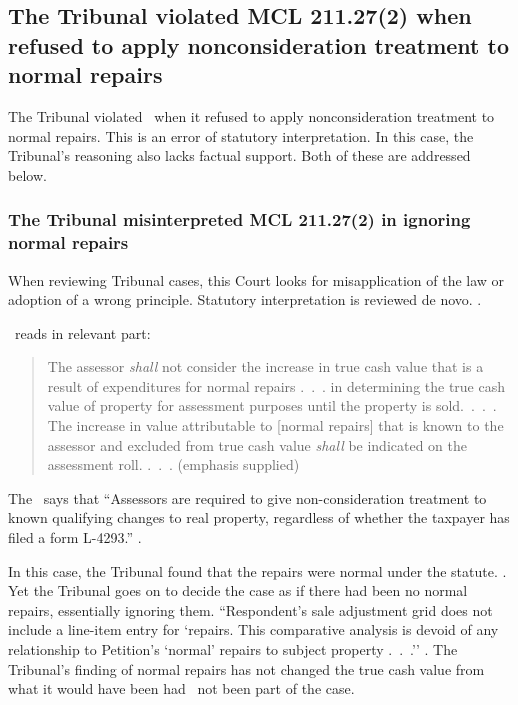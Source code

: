 \documentclass[12pt,\documentclassflag]{michiganCourtOfAppealsBrief}
\begin{document}
\subsection{The Tribunal violated MCL 211.27(2) when refused to apply nonconsideration treatment to normal repairs}

The Tribunal violated \mathieuGast\ when it refused to apply nonconsideration treatment to normal repairs. This is an error of statutory interpretation. In this case, the Tribunal's reasoning also lacks factual support. Both of these are addressed below.

\subsubsection{The Tribunal misinterpreted MCL 211.27(2) in ignoring normal repairs}

When reviewing Tribunal cases, this Court looks for misapplication of the law or adoption of a wrong principle. Statutory interpretation is reviewed de novo. . 

\mathieuGast\ reads in relevant part:

\begin{quote}
The assessor {\em shall} not consider the increase in true cash value that is a result of expenditures for normal repairs .~.~. in determining the true cash value of property for assessment purposes until the property is sold.~.~.~. The increase in value attributable to [normal repairs] that is known to the assessor and excluded from true cash value {\em shall} be indicated on the assessment roll. .~.~. (emphasis supplied)
\end{quote}

The \STC\ says that ``Assessors are required to give non-consideration treatment to known qualifying changes to real property, regardless of whether the taxpayer has filed a form L-4293.'' .

In this case, the Tribunal found that the repairs were normal under the statute. \foj[4]. Yet the Tribunal goes on to decide the case as if there had been no normal repairs, essentially ignoring them. ``Respondent's sale adjustment grid does not include a line-item entry for `repairs. This comparative analysis is devoid of any relationship to Petition's `normal' repairs to subject property .~.~.'' \foj[6]. The Tribunal's finding of normal repairs has not changed the true cash value from what it would have been had \mathieuGast\ not been part of the case.
\end{document}
